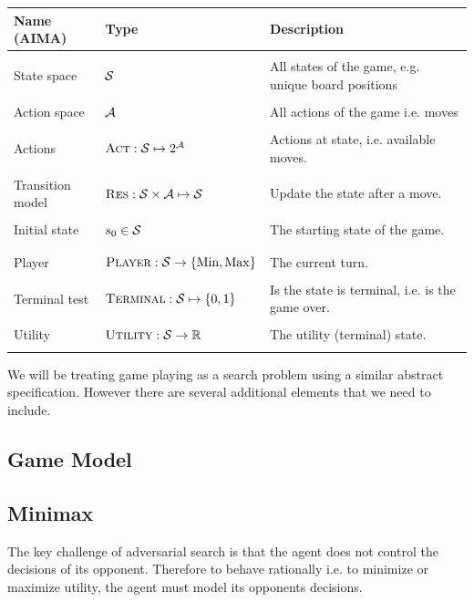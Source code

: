 \documentclass[11pt]{article}
\begin{document}
 \air
\begin{center}
\begin{tabularx}{\linewidth}{llX}
  \toprule
  Name (AIMA) & Type & Description \\
  \midrule
\\
 State space & $\mathcal{S}$ & All states of the game, e.g. unique board positions \\\\
 Action space & $\mathcal{A}$& All actions of the game i.e. moves\\\\
 Actions&  $\mathrm{\textsc{Act}}: \mathcal{S} \mapsto 2^{\mathcal{A}}$ & Actions at state, i.e. available moves. \\\\
 Transition model&  $\mathrm{\textsc{Res}}:  \mathcal{S} \times \mathcal{A} \mapsto \mathcal{S} $ &  Update the state after a move.  \\\\
 Initial state &  $s_0 \in \mathcal{S}$ & The starting state of the game.  \\\\
 \midrule \\
 Player& $\mathrm{\textsc{Player}}: \mathcal{S} \rightarrow \{\mathrm{Min}, \mathrm{Max}\}$ &  The current turn. \\\\
 Terminal test& $\mathrm{\textsc{Terminal}}: \mathcal{S} \mapsto \{0, 1\} $ &  Is the state is terminal, i.e. is the game over. \\\\
 Utility & $\mathrm{\textsc{Utility}}: \mathcal{S} \rightarrow \mathbb{R}$ & The utility (terminal) state. \\\\
 \bottomrule
\end{tabularx}
\end{center}

We will be treating game playing as a search problem using a similar abstract specification. However there are several additional elements that we need to include.

\subsection{Game Model}



\subsection{Minimax}

The key challenge of adversarial search is that the agent does not control the decisions of its opponent. Therefore to behave rationally i.e. to minimize or maximize utility, the agent must model its opponents decisions. 
\end{document}
